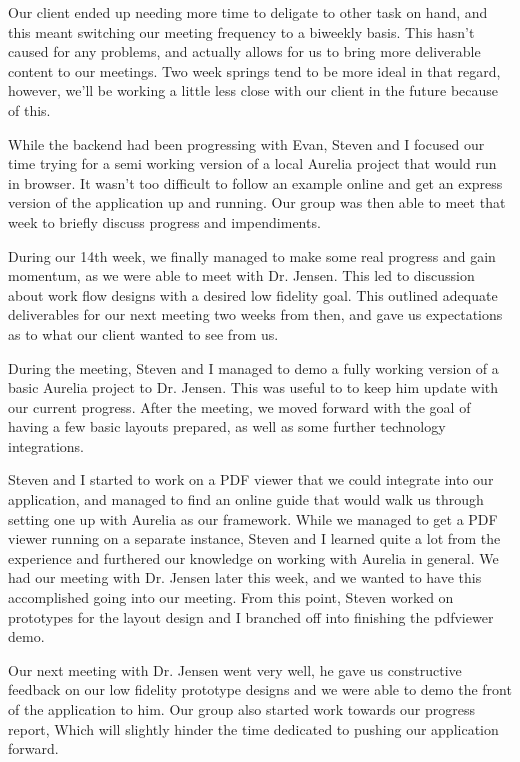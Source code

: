 \documentclass[onecolumn, draftclsnofoot,10pt, compsoc]{IEEEtran}
\begin{document}
Our client ended up needing more time to deligate to other task on hand, and this meant 
switching our meeting frequency to a biweekly basis. This hasn't caused for any problems,
and actually allows for us to bring more deliverable content to our meetings. Two week 
springs tend to be more ideal in that regard, however, we'll be working a little less 
close with our client in the future because of this. 

While the backend had been progressing with Evan, Steven and I focused our time trying for 
a semi working version of a local Aurelia project that would run in browser. It wasn't too
difficult to follow an example online and get an express version of the application up and 
running. Our group was then able to meet that week to briefly discuss progress and 
impendiments. 

During our 14th week, we finally managed to make some real progress and gain momentum, as 
we were able to meet with Dr. Jensen. This led to discussion about work flow designs with a 
desired low fidelity goal. This outlined adequate deliverables for our next meeting two weeks 
from then, and gave us expectations as to what our client wanted to see from us. 

During the meeting, Steven and I managed to demo a fully working version of a basic Aurelia 
project to Dr. Jensen. This was useful to to keep him update with our current progress. After 
the meeting, we moved forward with the goal of having a few basic layouts prepared, as well 
as some further technology integrations. 

Steven and I started to work on a PDF viewer that we could integrate into our application, 
and managed to find an online guide that would walk us through setting one up with Aurelia 
as our framework. While we managed to get a PDF viewer running on a separate instance, Steven 
and I learned quite a lot from the experience and furthered our knowledge on working with 
Aurelia in general. We had our meeting with Dr. Jensen later this week, and we wanted to have 
this accomplished going into our meeting. From this point, Steven worked on prototypes for 
the layout design and I branched off into finishing the pdfviewer demo. 

Our next meeting with Dr. Jensen went very well, he gave us constructive feedback on our low 
fidelity prototype designs and we were able to demo the front of the application to him. 
Our group also started work towards our progress report, Which will slightly hinder the time 
dedicated to pushing our application forward.
\end{document}
